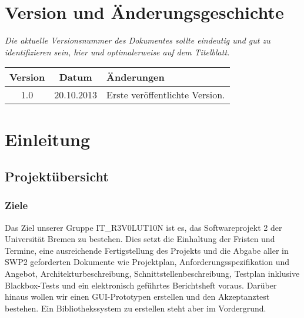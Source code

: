 \documentclass[fontsize=12pt,paper=a4,twoside]{scrartcl}
\begin{document}
\newpage

  \thispagestyle{fancy}
  \fancyhead{}
  \fancyfoot{}
  \renewcommand{\headrulewidth}{0.4pt}
  \tableofcontents

\newpage



\section*{Version und Änderungsgeschichte}

{\em Die aktuelle Versionsnummer des Dokumentes sollte eindeutig und gut zu
identifizieren sein, hier und optimalerweise auf dem Titelblatt.}

\begin{tabular}{ccl}
Version & Datum & Änderungen \\
\hline
1.0 & 20.10.2013 & Erste veröffentlichte Version. \\
\end{tabular}


\section{Einleitung}

\subsection{Projektübersicht}


\subsubsection{Ziele}
Das Ziel unserer Gruppe IT\_R3V0LUT10N ist es, das Softwareprojekt 2 der Universität Bremen zu bestehen. Dies setzt die Einhaltung der Fristen und Termine, eine ausreichende Fertigstellung des Projekts und die Abgabe aller in SWP2 geforderten Dokumente wie Projektplan, Anforderungsspezifikation und Angebot, Architekturbeschreibung, Schnittstellenbeschreibung, Testplan inklusive Blackbox-Tests und ein elektronisch geführtes Berichtsheft voraus. Darüber hinaus wollen wir einen GUI-Prototypen erstellen und den Akzeptanztest bestehen. Ein Bibliothekssystem zu erstellen steht aber im Vordergrund.
\end{document}
